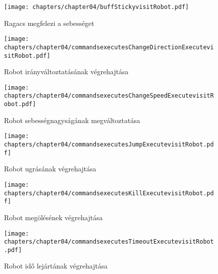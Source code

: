 \begin{figure}[h]
	\begin{center}
		\texttt{[image: chapters/chapter04/buffStickyvisitRobot.pdf]}
		\caption{Ragacs megfelezi a sebességet}
		\label{fig:buff.Sticky.visit}
	\end{center}
\end{figure}

\begin{figure}[h]
	\begin{center}
		\texttt{[image: chapters/chapter04/commandsexecutesChangeDirectionExecutevisitRobot.pdf]}
		\caption{Robot irányváltoztatásának végrehajtása}
		\label{fig:command.executes.ChangeDirectionExecute.visit}
	\end{center}
\end{figure}

\begin{figure}[h]
	\begin{center}
		\texttt{[image: chapters/chapter04/commandsexecutesChangeSpeedExecutevisitRobot.pdf]}
		\caption{Robot sebességnagyságának megváltoztatása}
		\label{fig:command.executes.ChangeSpeedExecute.visit}
	\end{center}
\end{figure}

\begin{figure}[h]
	\begin{center}
		\texttt{[image: chapters/chapter04/commandsexecutesJumpExecutevisitRobot.pdf]}
		\caption{Robot ugrásának végrehajtása}
		\label{fig:command.executes.JumpExecute.visit}
	\end{center}
\end{figure}

\begin{figure}[h]
	\begin{center}
		\texttt{[image: chapters/chapter04/commandsexecutesKillExecutevisitRobot.pdf]}
		\caption{Robot megölésének végrehajtása}
		\label{fig:command.executes.KillExecute.visit}
	\end{center}
\end{figure}

\begin{figure}[h]
	\begin{center}
		\texttt{[image: chapters/chapter04/commandsexecutesTimeoutExecutevisitRobot.pdf]}
		\caption{Robot idő lejártának végrehajtása}
		\label{fig:command.executes.TimeoutExecute.visit}
	\end{center}
\end{figure}

